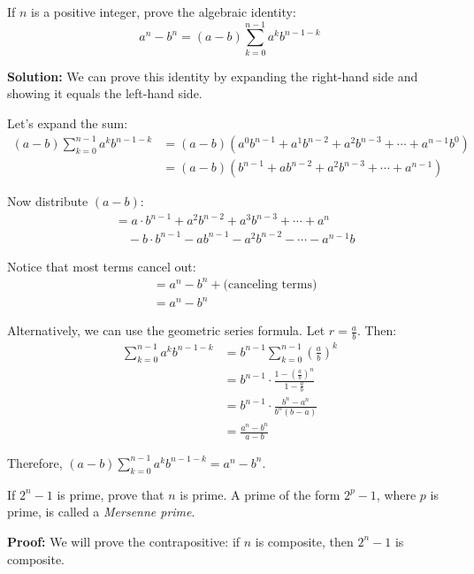 \begin{problembox}
If $n$ is a positive integer, prove the algebraic identity:
\[
a^n - b^n = (a - b)\sum_{k=0}^{n-1} a^k b^{n-1-k}
\]
\end{problembox}

\textbf{Solution:}
We can prove this identity by expanding the right-hand side and showing it equals the left-hand side.

Let's expand the sum:
\begin{align*}
(a - b)\sum_{k=0}^{n-1} a^k b^{n-1-k} &= (a - b)(a^0 b^{n-1} + a^1 b^{n-2} + a^2 b^{n-3} + \cdots + a^{n-1} b^0) \\
&= (a - b)(b^{n-1} + a b^{n-2} + a^2 b^{n-3} + \cdots + a^{n-1})
\end{align*}

Now distribute $(a - b)$:
\begin{align*}
&= a \cdot b^{n-1} + a^2 b^{n-2} + a^3 b^{n-3} + \cdots + a^n \\
&\quad - b \cdot b^{n-1} - a b^{n-1} - a^2 b^{n-2} - \cdots - a^{n-1} b
\end{align*}

Notice that most terms cancel out:
\begin{align*}
&= a^n - b^n + \text{(canceling terms)} \\
&= a^n - b^n
\end{align*}

Alternatively, we can use the geometric series formula. Let $r = \frac{a}{b}$. Then:
\begin{align*}
\sum_{k=0}^{n-1} a^k b^{n-1-k} &= b^{n-1} \sum_{k=0}^{n-1} \left(\frac{a}{b}\right)^k \\
&= b^{n-1} \cdot \frac{1 - \left(\frac{a}{b}\right)^n}{1 - \frac{a}{b}} \\
&= b^{n-1} \cdot \frac{b^n - a^n}{b^n(b - a)} \\
&= \frac{a^n - b^n}{a - b}
\end{align*}

Therefore, $(a - b)\sum_{k=0}^{n-1} a^k b^{n-1-k} = a^n - b^n$.

\begin{problembox}
If $2^n - 1$ is prime, prove that $n$ is prime. A prime of the form $2^p - 1$, where $p$ is prime, is called a \textit{Mersenne prime}.
\end{problembox}

\textbf{Proof:}
We will prove the contrapositive: if $n$ is composite, then $2^n - 1$ is composite.

